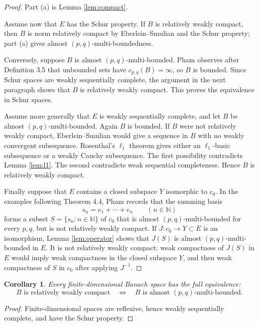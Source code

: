 \documentclass[11pt]{article}
\newtheorem{corollary}{Corollary}
\newcommand{\N}{\mathbb N}
\begin{document}
\begin{proof}
Part (a) is Lemma \ref{lem:compact}.

Assume now that \(E\) has the Schur property.  If \(B\) is relatively weakly
compact, then \(B\) is norm relatively compact by Eberlein--Smulian and the
Schur property; part (a) gives almost \((p,q)\)-multi-boundedness.

Conversely, suppose \(B\) is almost \((p,q)\)-multi-bounded.  Pham observes
after Definition 3.5 that unbounded sets have \(c_{p,q}(B)=\infty\), so \(B\)
is bounded.  Since Schur spaces are weakly sequentially complete, the argument
in the next paragraph shows that \(B\) is relatively weakly compact.  This
proves the equivalence in Schur spaces.

Assume more generally that \(E\) is weakly sequentially complete, and let
\(B\) be almost \((p,q)\)-multi-bounded.  Again \(B\) is bounded.  If \(B\)
were not relatively weakly compact, Eberlein--Smulian would give a sequence in
\(B\) with no weakly convergent subsequence.  Rosenthal's \(\ell_1\) theorem
gives either an \(\ell_1\)-basic subsequence or a weakly Cauchy subsequence.
The first possibility contradicts Lemma \ref{lem:l1}.  The second contradicts
weak sequential completeness.  Hence \(B\) is relatively weakly compact.

Finally suppose that \(E\) contains a closed subspace \(Y\) isomorphic to
\(c_0\).  In the examples following Theorem 4.4, Pham records that the summing
basis
\[
  s_n=e_1+\cdots+e_n\qquad(n\in\N)
\]
forms a subset \(S=\{s_n:n\in\N\}\) of \(c_0\) that is almost
\((p,q)\)-multi-bounded for every \(p,q\), but is not relatively weakly
compact.  If \(J:c_0\to Y\subset E\) is an isomorphism, Lemma
\ref{lem:operator} shows that \(J(S)\) is almost \((p,q)\)-multi-bounded in
\(E\).  It is not relatively weakly compact: weak compactness of \(J(S)\) in
\(E\) would imply weak compactness in the closed subspace \(Y\), and then weak
compactness of \(S\) in \(c_0\) after applying \(J^{-1}\).
\end{proof}

\begin{corollary}
Every finite-dimensional Banach space has the full equivalence:
\[
  B\text{ is relatively weakly compact}
  \quad\Longleftrightarrow\quad
  B\text{ is almost }(p,q)\text{-multi-bounded}.
\]
\end{corollary}

\begin{proof}
Finite-dimensional spaces are reflexive, hence weakly sequentially complete,
and have the Schur property.
\end{proof}
\end{document}
